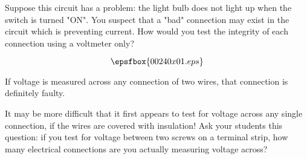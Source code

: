 

Suppose this circuit has a problem: the light bulb does not light up when the switch is turned "ON".  You suspect that a "bad" connection may exist in the circuit which is preventing current.  How would you test the integrity of each connection using a voltmeter only?

$$\epsfbox{00240x01.eps}$$







If voltage is measured across any connection of two wires, that connection is definitely faulty.







It may be more difficult that it first appears to test for voltage across any single connection, if the wires are covered with insulation!  Ask your students this question: if you test for voltage between two screws on a terminal strip, how many electrical connections are you actually measuring voltage across?




